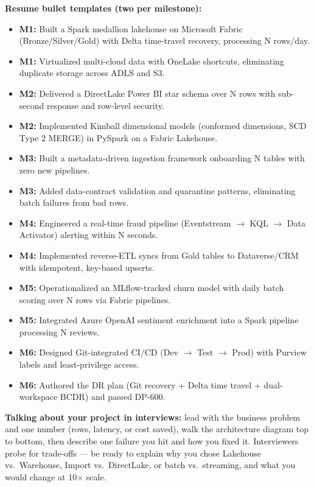 \documentclass[11pt, a4paper]{article}
\begin{document}
\noindent\textbf{Resume bullet templates (two per milestone):}
\begin{itemize}[label=-, itemsep=0pt]
    \item \textbf{M1:} Built a Spark medallion lakehouse on Microsoft Fabric (Bronze/Silver/Gold) with Delta time-travel recovery, processing N rows/day.
    \item \textbf{M1:} Virtualized multi-cloud data with OneLake shortcuts, eliminating duplicate storage across ADLS and S3.
    \item \textbf{M2:} Delivered a DirectLake Power BI star schema over N rows with sub-second response and row-level security.
    \item \textbf{M2:} Implemented Kimball dimensional models (conformed dimensions, SCD Type 2 MERGE) in PySpark on a Fabric Lakehouse.
    \item \textbf{M3:} Built a metadata-driven ingestion framework onboarding N tables with zero new pipelines.
    \item \textbf{M3:} Added data-contract validation and quarantine patterns, eliminating batch failures from bad rows.
    \item \textbf{M4:} Engineered a real-time fraud pipeline (Eventstream $\rightarrow$ KQL $\rightarrow$ Data Activator) alerting within N seconds.
    \item \textbf{M4:} Implemented reverse-ETL syncs from Gold tables to Dataverse/CRM with idempotent, key-based upserts.
    \item \textbf{M5:} Operationalized an MLflow-tracked churn model with daily batch scoring over N rows via Fabric pipelines.
    \item \textbf{M5:} Integrated Azure OpenAI sentiment enrichment into a Spark pipeline processing N reviews.
    \item \textbf{M6:} Designed Git-integrated CI/CD (Dev $\rightarrow$ Test $\rightarrow$ Prod) with Purview labels and least-privilege access.
    \item \textbf{M6:} Authored the DR plan (Git recovery + Delta time travel + dual-workspace BCDR) and passed DP-600.
\end{itemize}

\noindent\textbf{Talking about your project in interviews:} lead with the business problem and one number (rows, latency, or cost saved), walk the architecture diagram top to bottom, then describe one failure you hit and how you fixed it. Interviewers probe for trade-offs --- be ready to explain why you chose Lakehouse vs.\ Warehouse, Import vs.\ DirectLake, or batch vs.\ streaming, and what you would change at 10$\times$ scale.
\end{document}
